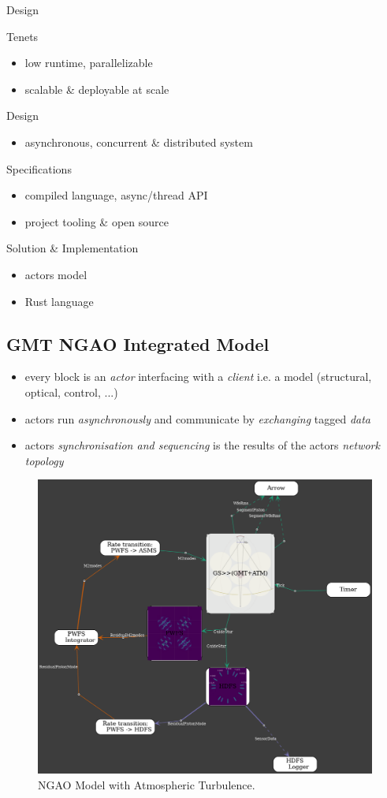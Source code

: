\documentclass[]{AO4ELT}  %
\begin{document}
Design

   {Tenets}
\begin{itemize}
   \item low runtime, parallelizable
   \item scalable \& deployable at scale
\end{itemize}
{Design}
\begin{itemize}
   \item asynchronous, concurrent
         \& distributed system
\end{itemize}
{Specifications}
\begin{itemize}
   \item compiled language, async/thread API
   \item project tooling \& open source
\end{itemize}
{Solution \& Implementation}
\begin{itemize}
   \item actors model
   \item Rust language
\end{itemize}

\subsection{GMT NGAO Integrated Model}
\label{sec:gmt-ngao-im}

\begin{itemize}
   \item every block is an \emph{actor} interfacing with a \emph{client} i.e. a model (structural, optical, control, ...)
   \item actors run \emph{asynchronously} and communicate by \emph{exchanging} tagged \emph{data}
   \item actors \emph{synchronisation and sequencing} is the results of the actors \emph{network topology}
\end{itemize}

\begin{figure}
   \centering
   \includegraphics[width=0.6\linewidth]{NGAO.dot.png}
   \caption{NGAO Model with Atmospheric Turbulence.}
   \label{fig:16}
\end{figure}
\end{document}
